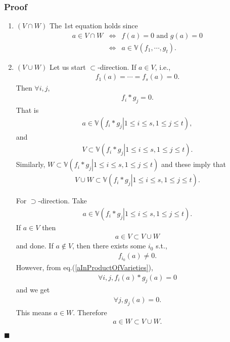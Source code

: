 \documentclass[11pt]{book}
\begin{document}
\subsubsection{Proof}
\begin{enumerate}

\item $(V \cap W)$
The 1st equation holds since
\begin{eqnarray}
a \in V \cap W &\Leftrightarrow& f(a) = 0 \text{ and } g(a) = 0 \\
&\Leftrightarrow& a \in \mathbb{V}(f_1, \cdots, g_t).
\end{eqnarray}

\item $(V \cup W)$
Let us start $\subset$-direction.
If $a \in V$, i.e.,
\begin{eqnarray}
f_1(a) = \cdots = f_s(a) = 0.
\end{eqnarray}
Then $\forall i,j$,
\begin{eqnarray}
f_i * g_j = 0.
\end{eqnarray}
That is 
\begin{eqnarray}
a \in \mathbb{V}\left( \left. f_i * g_j \right| 1 \leq i \leq s, 1 \leq j \leq t \right),
\end{eqnarray}
and
\begin{eqnarray}
V \subset \mathbb{V}\left( \left. f_i * g_j \right| 1 \leq i \leq s, 1 \leq j \leq t \right).
\end{eqnarray}
Similarly, $W \subset \mathbb{V}\left( \left. f_i * g_j \right| 1 \leq i \leq s, 1 \leq j \leq t \right)$ and these imply that
\begin{eqnarray}
V \cup W \subset \mathbb{V}\left( \left. f_i * g_j \right| 1 \leq i \leq s, 1 \leq j \leq t \right).
\end{eqnarray}

For $\supset$-direction.
Take
\begin{eqnarray}
\label{aInProductOfVarieties}
a \in \mathbb{V}\left( \left. f_i * g_j \right| 1 \leq i \leq s, 1 \leq j \leq t \right).
\end{eqnarray}
If $a \in V$ then
\begin{eqnarray}
a \in V \subset V \cup W
\end{eqnarray}
and done.
If $a \not\in V$, then there exists some $i_0$ s.t.,
\begin{eqnarray}
f_{i_0}(a) \neq 0.
\end{eqnarray}
However, from eq.(\ref{aInProductOfVarieties}), 
\begin{eqnarray}
\forall i,j, f_i(a) * g_j(a) = 0
\end{eqnarray}
and we get
\begin{eqnarray}
\forall j, g_j(a) = 0.
\end{eqnarray}
This means $a \in W$.
Therefore
\begin{eqnarray}
a \in W \subset V \cup W.
\end{eqnarray}

\end{enumerate}
$\blacksquare$
\end{document}
